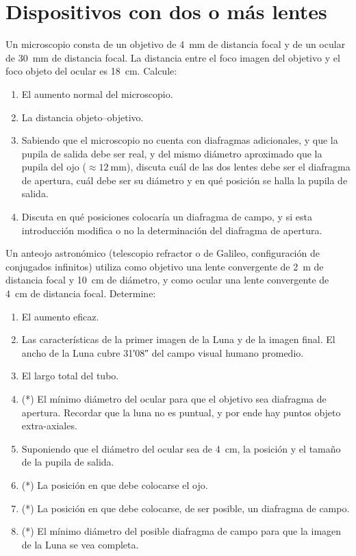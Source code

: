 \section*{Dispositivos con dos o más lentes}


\item Un microscopio consta de un objetivo de \SI{4}{\milli\metre} de distancia focal y de un ocular de \SI{30}{\milli\metre} de distancia focal.
La distancia entre el foco imagen del objetivo y el foco objeto del ocular es \SI{18}{\centi\metre}.
Calcule:
\begin{enumerate}
	\item El aumento normal del microscopio.
	\item La distancia objeto--objetivo.
	\item Sabiendo que el microscopio no cuenta con diafragmas adicionales, y que la pupila de salida debe ser real, y del mismo diámetro aproximado que la pupila del ojo (\(\approx \SI{12}{\milli\metre}\)), discuta cuál de las dos lentes debe ser el diafragma de apertura, cuál debe ser su diámetro y en qué posición se halla la pupila de salida.
	\item Discuta en qué posiciones colocaría un diafragma de campo, y si esta introducción modifica o no la determinación del diafragma de apertura.
\end{enumerate}



\item Un anteojo astronómico (telescopio refractor o de Galileo, configuración de conjugados infinitos) utiliza como objetivo una lente convergente de \SI{2}{\metre} de distancia focal y \SI{10}{\centi\metre} de diámetro, y como ocular una lente convergente de \SI{4}{\centi\metre} de distancia focal. 
Determine:
\begin{enumerate}
	\item El aumento eficaz.
	\item Las características de la primer imagen de la Luna y de la imagen final.
	El ancho de la Luna cubre \ang{;31;08} del campo visual humano promedio.
	\item El largo total del tubo.
	\item (*) El mínimo diámetro del ocular para que el objetivo sea diafragma de apertura.
	Recordar que la luna no es puntual, y por ende hay puntos objeto extra-axiales.
	\item Suponiendo que el diámetro del ocular sea de \SI{4}{\centi\metre}, la posición y el tamaño de la pupila de salida.
	\item (*) La posición en que debe colocarse el ojo.
	\item (*) La posición en que debe colocarse, de ser posible, un diafragma de campo.
	\item (*) El mínimo diámetro del posible diafragma de campo para que la imagen de la Luna se vea completa.
\end{enumerate}



